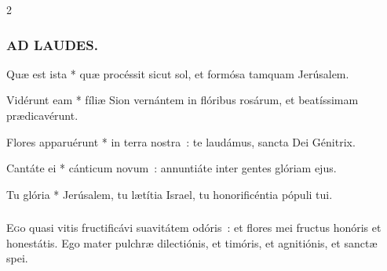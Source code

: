 \documentclass[9pt,twoside]{extarticle}
\begin{document}
\begin{multicols}{2}
\subsubsection*{\center \textsc{AD LAUDES.}}
\begin{center}\end{center}
\begin{tightlist}{}
\item {} Quæ est ista * quæ procéssit sicut sol, et formósa tamquam Jerúsalem.
\item {\small {}}
\item {} Vidérunt eam * fíliæ Sion vernántem in flóribus rosárum, et beatíssimam prædicavérunt.
\item {} Flores apparuérunt * in terra nostra~: te laudámus, sancta Dei Génitrix.
\item {} Cantáte ei * cánticum novum~: annuntiáte inter gentes glóriam ejus.
\item {} Tu glória * Jerúsalem, tu lætítia Israel, tu honorificéntia pópuli tui.
\end{tightlist}

\subsubsection*{\center {}}
\lettrine{E}go quasi vitis fructificávi suavitátem odóris~: et flores mei fructus honóris et honestátis. Ego mater pulchræ dilectiónis, et timóris, et agnitiónis, et sanctæ spei.


\end{multicols}
\end{document}
